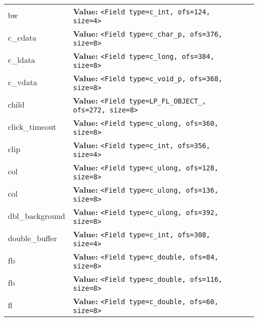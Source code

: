 \begin{longtable}{|p{\varnamewidth}|p{\vardescrwidth}|l}
\raggedright b\-w\- & \raggedright \textbf{Value:} 
{\tt {\textless}Field type=c\_int, ofs=124, size=4{\textgreater}}&\\
\cline{1-2}
\raggedright c\-\_\-c\-d\-a\-t\-a\- & \raggedright \textbf{Value:} 
{\tt {\textless}Field type=c\_char\_p, ofs=376, size=8{\textgreater}}&\\
\cline{1-2}
\raggedright c\-\_\-l\-d\-a\-t\-a\- & \raggedright \textbf{Value:} 
{\tt {\textless}Field type=c\_long, ofs=384, size=8{\textgreater}}&\\
\cline{1-2}
\raggedright c\-\_\-v\-d\-a\-t\-a\- & \raggedright \textbf{Value:} 
{\tt {\textless}Field type=c\_void\_p, ofs=368, size=8{\textgreater}}&\\
\cline{1-2}
\raggedright c\-h\-i\-l\-d\- & \raggedright \textbf{Value:} 
{\tt {\textless}Field type=LP\_FL\_OBJECT\_, ofs=272, size=8{\textgreater}}&\\
\cline{1-2}
\raggedright c\-l\-i\-c\-k\-\_\-t\-i\-m\-e\-o\-u\-t\- & \raggedright \textbf{Value:} 
{\tt {\textless}Field type=c\_ulong, ofs=360, size=8{\textgreater}}&\\
\cline{1-2}
\raggedright c\-l\-i\-p\- & \raggedright \textbf{Value:} 
{\tt {\textless}Field type=c\_int, ofs=356, size=4{\textgreater}}&\\
\cline{1-2}
\raggedright c\-o\-l\-1\- & \raggedright \textbf{Value:} 
{\tt {\textless}Field type=c\_ulong, ofs=128, size=8{\textgreater}}&\\
\cline{1-2}
\raggedright c\-o\-l\-2\- & \raggedright \textbf{Value:} 
{\tt {\textless}Field type=c\_ulong, ofs=136, size=8{\textgreater}}&\\
\cline{1-2}
\raggedright d\-b\-l\-\_\-b\-a\-c\-k\-g\-r\-o\-u\-n\-d\- & \raggedright \textbf{Value:} 
{\tt {\textless}Field type=c\_ulong, ofs=392, size=8{\textgreater}}&\\
\cline{1-2}
\raggedright d\-o\-u\-b\-l\-e\-\_\-b\-u\-f\-f\-e\-r\- & \raggedright \textbf{Value:} 
{\tt {\textless}Field type=c\_int, ofs=308, size=4{\textgreater}}&\\
\cline{1-2}
\raggedright f\-b\-1\- & \raggedright \textbf{Value:} 
{\tt {\textless}Field type=c\_double, ofs=84, size=8{\textgreater}}&\\
\cline{1-2}
\raggedright f\-b\-2\- & \raggedright \textbf{Value:} 
{\tt {\textless}Field type=c\_double, ofs=116, size=8{\textgreater}}&\\
\cline{1-2}
\raggedright f\-l\-1\- & \raggedright \textbf{Value:} 
{\tt {\textless}Field type=c\_double, ofs=60, size=8{\textgreater}}&\\

\end{longtable}
